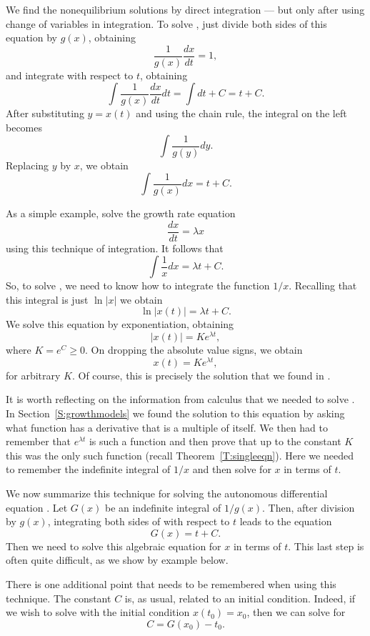 \documentclass{ximera}
\begin{document}
We find the 
nonequilibrium solutions by direct integration --- but only after 
using change of variables in integration.  To solve ,
just divide both sides of this equation by $g(x)$, obtaining
\[
\frac{1}{g(x)}\frac{dx}{dt} = 1,
\]
and integrate with respect to $t$, obtaining
\[
\int \frac{1}{g(x)} \frac{dx}{dt} dt = \int dt + C = t + C.
\]
After substituting $y=x(t)$ and using the chain rule, the integral on 
the left becomes
\[
\int\frac{1}{g(y)}dy.
\]
Replacing $y$ by $x$, we obtain
\[
\int\frac{1}{g(x)}dx = t + C.
\]

As a simple example, solve the growth rate equation  
\begin{equation}  \label{lin1a} 
\frac{dx}{dt} = \lambda x
\end{equation}
using this technique of integration.  It follows that 
\[
\int \frac{1}{x}dx = \lambda t + C.
\]
So, to solve , we need to know how to integrate the function 
$1/x$.  Recalling that this integral is just $\ln |x|$ we obtain
\[
\ln |x(t)| = \lambda t + C.
\]
We solve this equation by exponentiation, obtaining
\[
|x(t)| = K e^{\lambda t},
\]
where $K = e^C \geq 0$.  On dropping the absolute value signs, we obtain
\[
x(t) =   K e^{\lambda t},
\]
for arbitrary $K$.  Of course, this is precisely the solution that we 
found in .  

It is worth reflecting on the information from calculus that we needed to 
solve .  In Section~\ref{S:growthmodels} we found the solution to 
this equation by asking what function has a derivative that is a multiple of 
itself.  We then had to remember that $e^{\lambda t}$ is such a function and 
then prove that up to the constant $K$ this was the only such function 
(recall Theorem~\ref{T:singleeqn}).  Here we needed to remember the 
indefinite integral of $1/x$ and then solve for $x$ in terms of $t$.  

We now summarize this technique for solving the autonomous differential 
equation .  Let $G(x)$ be an indefinite integral of $1/g(x)$. 
Then, after division by $g(x)$, integrating both sides of  
with respect to $t$ leads to the equation 
\[
G(x) = t + C.
\]
Then we need to solve this algebraic equation for $x$ in terms of $t$.  This
last step is often quite difficult, as we show by example below.

There is one additional point that needs to be remembered when using 
this technique.  The constant $C$ is, as usual, related to an initial
condition.  Indeed, if we wish to solve  with the initial
condition $x(t_0)=x_0$, then we can solve for 
\[
C = G(x_0) - t_0.
\]
\end{document}
